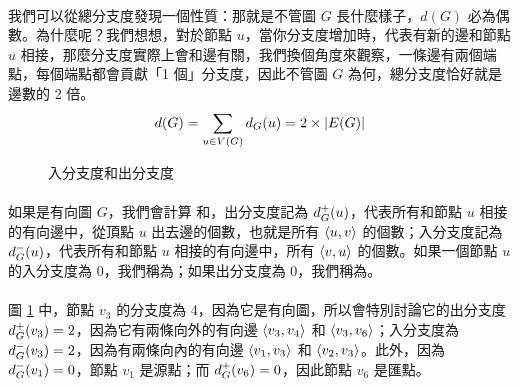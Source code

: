 \documentclass[12pt,a4paper,oneside]{report}
\begin{document}
\begin{CJK}{UTF8}{bkai}
\paragraph{}我們可以從總分支度發現一個性質：那就是不管圖 $G$ 長什麼樣子，$d(G)$ 必為偶數。為什麼呢？我們想想，對於節點 $u$，當你分支度增加時，代表有新的邊和節點 $u$ 相接，那麼分支度實際上會和邊有關，我們換個角度來觀察，一條邊有兩個端點，每個端點都會貢獻「1 個」分支度，因此不管圖 $G$ 為何，總分支度恰好就是邊數的 2 倍。
\begin{align}
\label{eq:degree_twice_edges}
d(G)=\sum_{u\in{V(G)}}{d_{G}{(u)}}=2\times{|E(G)|}
\end{align}
\begin{figure}[h!]
\centering
{}
\caption{入分支度和出分支度}
\label{fig:directed_cal_degree}
\end{figure}

\paragraph{}如果是有向圖 $G$，我們會計算\textbf{} 和\textbf{}，出分支度記為 $d^{+}_{G}{(u)}$，代表所有和節點 $u$ 相接的有向邊中，從頂點 $u$ 出去邊的個數，也就是所有 $\langle{}{{u},{v}}\rangle{}$ 的個數；入分支度記為 $d^{-}_{G}{(u)}$，代表所有和節點 $u$ 相接的有向邊中，所有 $\langle{}{{v},{u}}\rangle{}$ 的個數。如果一個節點 $u$ 的入分支度為 0，我們稱為\textbf{}；如果出分支度為 0，我們稱為\textbf{}。
\paragraph{}圖 \ref{fig:directed_cal_degree} 中，節點 $v_3$ 的分支度為 4，因為它是有向圖，所以會特別討論它的出分支度 $d^{+}_{G}{(v_3)}=2$，因為它有兩條向外的有向邊 $\langle{}{{v_3},{v_4}}\rangle{}$ 和 $\langle{}{{v_3},{v_6}}\rangle{}$；入分支度為 $d^{-}_{G}{(v_3)}=2$，因為有兩條向內的有向邊 $\langle{}{{v_1},{v_3}}\rangle{}$ 和 $\langle{}{{v_2},{v_3}}\rangle{}$。此外，因為 $d^{-}_{G}{(v_1)}=0$，節點 $v_1$ 是源點；而 $d^{+}_{G}{(v_6)}=0$，因此節點 $v_6$ 是匯點。

\end{CJK}
\end{document}
